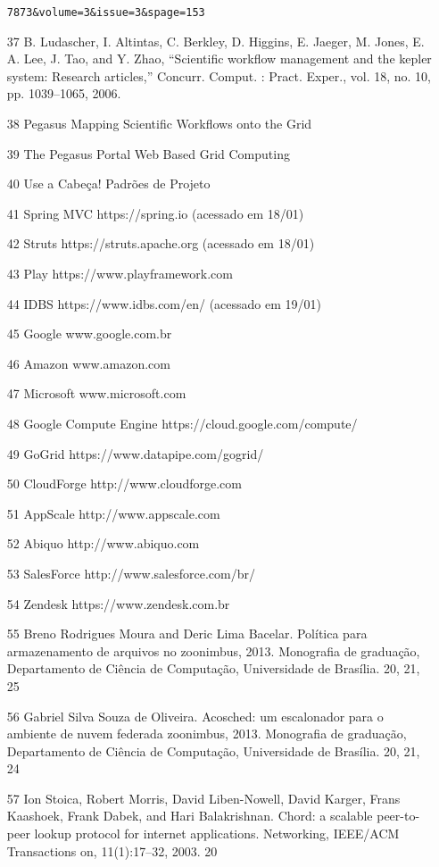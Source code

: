 \documentclass[engenharia]{UnB-CIC}%
\begin{document}
\begin{itemize}
\begin{verbatim}
7873&volume=3&issue=3&spage=153
\end{verbatim}
    \item [37] B. Ludascher, I. Altintas, C. Berkley, D. Higgins, E. Jaeger, M. Jones, E. A. Lee, J. Tao, and Y. Zhao, “Scientific workflow management and the kepler system: Research articles,” Concurr. Comput. : Pract. Exper., vol. 18, no. 10, pp. 1039–1065, 2006.
    \item [38] Pegasus Mapping Scientific Workflows onto the Grid 
	\item [39] The Pegasus Portal Web Based Grid Computing
    \item [40] Use a Cabeça! Padrões de Projeto
    \item [41] Spring MVC https://spring.io (acessado em 18/01)
    \item [42] Struts https://struts.apache.org (acessado em 18/01)
    \item [43] Play https://www.playframework.com
	\item [44] IDBS https://www.idbs.com/en/ (acessado em 19/01)
	\item [45] Google www.google.com.br
    \item [46] Amazon www.amazon.com
    \item [47] Microsoft www.microsoft.com
    \item [48] Google Compute Engine https://cloud.google.com/compute/
    \item [49] GoGrid https://www.datapipe.com/gogrid/
    \item [50] CloudForge http://www.cloudforge.com
    \item [51] AppScale http://www.appscale.com
    \item [52] Abiquo http://www.abiquo.com
    \item [53] SalesForce http://www.salesforce.com/br/
    \item [54] Zendesk https://www.zendesk.com.br    
	\item [55] Breno Rodrigues Moura and Deric Lima Bacelar. Política para armazenamento de arquivos no zoonimbus, 2013. Monografia de graduação, Departamento de Ciência de Computação, Universidade de Brasília. 20, 21, 25
	\item [56] Gabriel Silva Souza de Oliveira. Acosched: um escalonador para o ambiente de nuvem federada zoonimbus, 2013. Monografia de graduação, Departamento de Ciência de Computação, Universidade de Brasília. 20, 21, 24
	\item [57] Ion Stoica, Robert Morris, David Liben-Nowell, David Karger, Frans Kaashoek, Frank Dabek, and Hari Balakrishnan. Chord: a scalable peer-to-peer lookup protocol for internet applications. Networking, IEEE/ACM Transactions on, 11(1):17–32, 2003. 20

\end{itemize}
\end{document}
